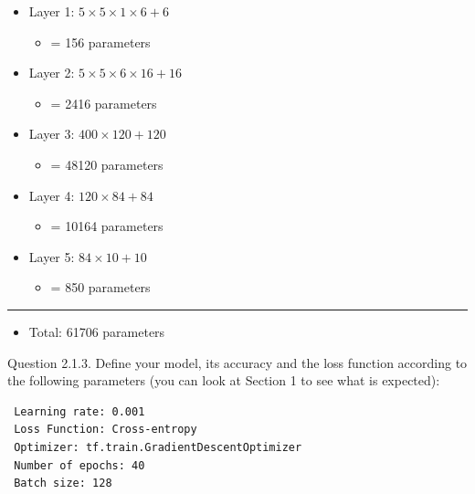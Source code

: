 \documentclass[11pt]{article}
\providecommand{\tightlist}{%
      \setlength{\itemsep}{0pt}\setlength{\parskip}{0pt}}
\begin{document}
\begin{itemize}
\tightlist
\item
  Layer 1: \(5\times5\times1\times6 + 6\)

  \begin{itemize}
  \tightlist
  \item
    = 156 parameters
  \end{itemize}
\item
  Layer 2: \(5\times5\times6\times16 + 16\)

  \begin{itemize}
  \tightlist
  \item
    = 2416 parameters
  \end{itemize}
\item
  Layer 3: \(400 \times 120 + 120\)

  \begin{itemize}
  \tightlist
  \item
    = 48120 parameters
  \end{itemize}
\item
  Layer 4: \(120 \times 84 + 84\)

  \begin{itemize}
  \tightlist
  \item
    = 10164 parameters
  \end{itemize}
\item
  Layer 5: \(84 \times 10 + 10\)

  \begin{itemize}
  \tightlist
  \item
    = 850 parameters
  \end{itemize}
\end{itemize}

\begin{center}\rule{0.5\linewidth}{\linethickness}\end{center}

\begin{itemize}
\tightlist
\item
  Total: 61706 parameters
\end{itemize}

     Question 2.1.3. Define your model, its accuracy and the loss function
according to the following parameters (you can look at Section 1 to see
what is expected):

\begin{verbatim}
 Learning rate: 0.001
 Loss Function: Cross-entropy
 Optimizer: tf.train.GradientDescentOptimizer
 Number of epochs: 40
 Batch size: 128
\end{verbatim}
\end{document}
